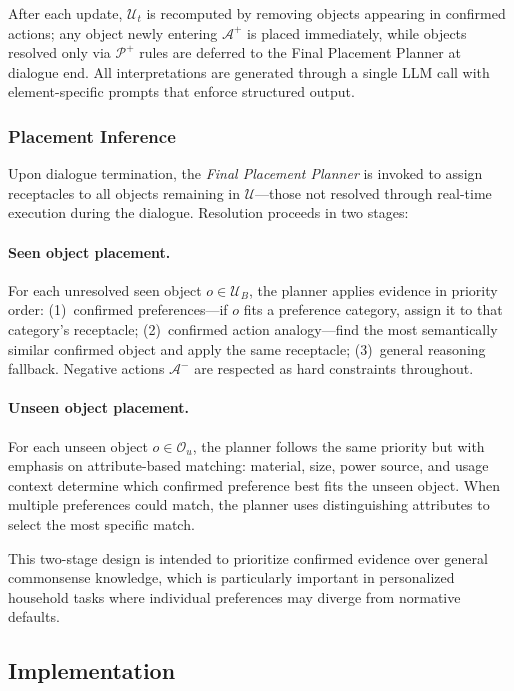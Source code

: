 \documentclass[manuscript,review,anonymous]{acmart}
\begin{document}
{After each update, $\mathcal{U}_t$ is recomputed by removing objects appearing in confirmed actions; any object newly entering $\mathcal{A}^+$ is placed immediately, while objects resolved only via $\mathcal{P}^+$ rules are deferred to the Final Placement Planner at dialogue end. All interpretations are generated through a single LLM call with element-specific prompts that enforce structured output.

\subsubsection{Placement Inference}
\label{sec:final-planner}

Upon dialogue termination, the \textit{Final Placement Planner} is invoked to assign receptacles to all objects remaining in $\mathcal{U}$---those not resolved through real-time execution during the dialogue. Resolution proceeds in two stages:

\paragraph{Seen object placement.} For each unresolved seen object $o \in \mathcal{U}_B$, the planner applies evidence in priority order: (1)~confirmed preferences---if $o$ fits a preference category, assign it to that category's receptacle; (2)~confirmed action analogy---find the most semantically similar confirmed object and apply the same receptacle; (3)~general reasoning fallback. Negative actions $\mathcal{A}^-$ are respected as hard constraints throughout.

\paragraph{Unseen object placement.} For each unseen object $o \in \mathcal{O}_u$, the planner follows the same priority but with emphasis on attribute-based matching: material, size, power source, and usage context determine which confirmed preference best fits the unseen object. When multiple preferences could match, the planner uses distinguishing attributes to select the most specific match.

This two-stage design is intended to prioritize confirmed evidence over general commonsense knowledge, which is particularly important in personalized household tasks where individual preferences may diverge from normative defaults.

\subsection{Implementation}

}
\end{document}
